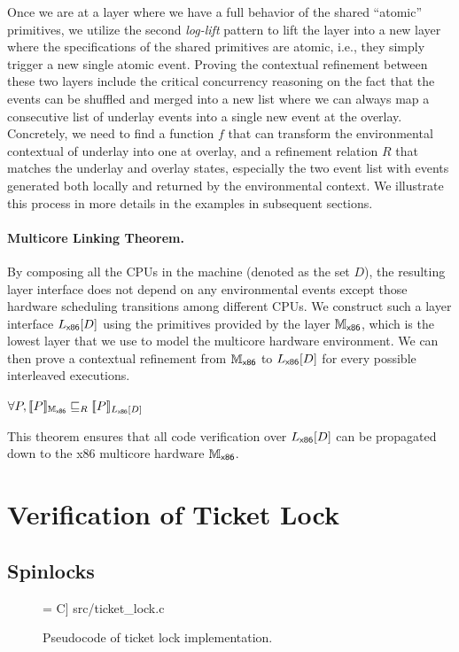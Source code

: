 Once we are at a layer where we have a full behavior of the shared
``atomic'' primitives, we utilize the second \emph{log-lift} pattern to
lift the layer into a new layer where the specifications of the shared
primitives are atomic, i.e., they simply trigger a new single atomic
event. Proving the contextual refinement between these two layers include
the critical concurrency reasoning on the fact that the events can be
shuffled and merged into a new list where we can always map a consecutive
list of underlay events into a single new event at the overlay.
Concretely, we need to find a function $f$ that can transform the environmental
contextual of underlay into one at overlay, and a refinement relation $R$
that matches the underlay and overlay states, especially the two event list
with events generated both locally and returned by the environmental context.
We illustrate this process in more details in the examples in subsequent sections.

\paragraph{Multicore Linking Theorem.}
By composing all the CPUs in the machine (denoted as the set $D$), the resulting 
layer interface does not depend on any environmental events except those
hardware scheduling transitions among different CPUs.
We construct such a layer interface $\PBoot[D]$
using the primitives provided by the layer $\Mach_{\boot}$, which is the lowest
layer that we use to model the multicore hardware environment. 
We can then prove a contextual refinement from  $\Mach_{\boot}$ to $\PBoot[D]$
for every possible interleaved executions.
\begin{theorem}
\label{thm:link}
$\forall P, \sem{\Mach_{\boot}}{P} \refines_R \sem{\PBoot[D]}{P}$
\end{theorem}
This theorem ensures that all code verification over $\PBoot[D]$ can be propagated down to the x86 multicore hardware 
$\Mach_{\boot}$.


\section{Verification of Ticket Lock}
\label{veri-ticket-lock}


\subsection{Spinlocks}
\begin{figure}[t]
 = C] {src/ticket_lock.c}
\caption{Pseudocode of ticket lock implementation.}
\label{fig:exp:real_ticket_lock}
\end{figure}

